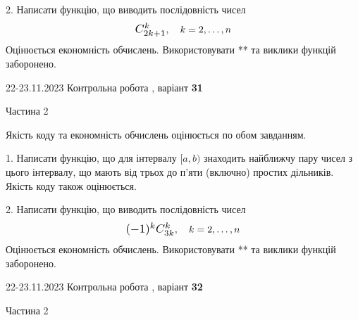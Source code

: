 \documentclass[12pt, ukrainian]{article}
\begin{document}
{{\begin {Large}
\vspace{10mm}



2. 
Написати функцію, що виводить послідовність чисел
$$\scalebox{1.2}{$C_{2k+1}^{k}$}, \quad k=2,\ldots,n$$
Оцінюється економність обчислень. Використовувати ** та виклики функцій заборонено.

\end{Large}\newpage




\begin {Huge}
{{22-23.11.2023 Контрольна робота , варіант  \No \textbf { 31 }\par}}

\begin{center}Частина 2
\end{center}
\vspace{10mm}
\end {Huge}

{
\begin {Large}
Якість коду та економність обчислень оцінюється по обом завданням.

\vspace{5mm}

1. Написати функцію, що для інтервалу $[a, b)$ знаходить найближчу пару чисел з цього інтервалу, що мають від трьох до п'яти (включно) простих дільників.\\	Якість коду також оцінюється. 



\vspace{10mm}



2. 
Написати функцію, що виводить послідовність чисел
$$\scalebox{1.2}{$(-1)^{k}C_{3k}^{k}$}, \quad k=2,\ldots,n$$
Оцінюється економність обчислень. Використовувати ** та виклики функцій заборонено.

\end{Large}\newpage




\begin {Huge}
{{22-23.11.2023 Контрольна робота , варіант  \No \textbf { 32 }\par}}

\begin{center}Частина 2
\end{center}
\vspace{10mm}
\end {Huge}

}}}
\end{document}

